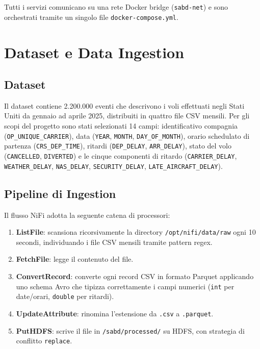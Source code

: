 \documentclass[sigconf]{acmart}
\begin{document}
Tutti i servizi comunicano su una rete Docker bridge (\texttt{sabd-net}) e
sono orchestrati tramite un singolo file \texttt{docker-compose.yml}.

\section{Dataset e Data Ingestion}

\subsection{Dataset}

Il dataset contiene 2.200.000 eventi che descrivono i voli effettuati negli
Stati Uniti da gennaio ad aprile 2025, distribuiti in quattro file CSV mensili.
Per gli scopi del progetto sono stati selezionati 14 campi: identificativo
compagnia (\texttt{OP\_UNIQUE\_CARRIER}), data (\texttt{YEAR}, \texttt{MONTH},
\texttt{DAY\_OF\_MONTH}), orario schedulato di partenza
(\texttt{CRS\_DEP\_TIME}), ritardi (\texttt{DEP\_DELAY}, \texttt{ARR\_DELAY}),
stato del volo (\texttt{CANCELLED}, \texttt{DIVERTED}) e le cinque componenti
di ritardo (\texttt{CARRIER\_DELAY}, \texttt{WEATHER\_DELAY},
\texttt{NAS\_DELAY}, \texttt{SECURITY\_DELAY},
\texttt{LATE\_AIRCRAFT\_DELAY}).

\subsection{Pipeline di Ingestion}

Il flusso NiFi adotta la seguente catena di processori:

\begin{enumerate}
  \item \textbf{ListFile}: scansiona ricorsivamente la directory
        \texttt{/opt/nifi/data/raw} ogni 10 secondi, individuando i file CSV
        mensili tramite pattern regex.
  \item \textbf{FetchFile}: legge il contenuto del file.
  \item \textbf{ConvertRecord}: converte ogni record CSV in formato Parquet
        applicando uno schema Avro che tipizza correttamente i campi
        numerici (\texttt{int} per date/orari, \texttt{double} per ritardi).
  \item \textbf{UpdateAttribute}: rinomina l'estensione da \texttt{.csv}
        a \texttt{.parquet}.
  \item \textbf{PutHDFS}: scrive il file in \texttt{/sabd/processed/} su HDFS,
        con strategia di conflitto \texttt{replace}.
\end{enumerate}
\end{document}
